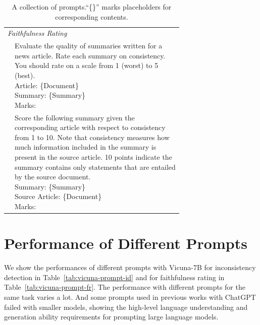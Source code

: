 \begin{table}[h!]
\begin{tabular}{l|p{4.85cm}}
		\multicolumn{2}{l}{\textit{Faithfulness Rating}} \\
		 \citet{gao2023human} & \makecell[l]{Evaluate the quality of summaries written for a \\news article. Rate each summary on consistency. \\You should rate on a scale from 1 (worst) to 5 \\(best).\\Article: \{Document\}\\Summary: \{Summary\}\\Marks:} \\
		\hline
	 \citet{luo2023chatgpt} & \makecell[l]{Score the following summary given the \\corresponding article with respect to consistency \\from 1 to 10. Note that consistency measures how\\ much information included in the summary is \\present in the source article. 10 points indicate the \\summary contains only statements that are entailed \\by the source document.\\Summary: \{Summary\}\\ Source Article: \{Document\}\\Marks:} \\
		\bottomrule[1pt]
	\end{tabular}
	\caption{A collection of prompts.``\{\}'' marks placeholders for corresponding contents.}
	\label{tab:prompt-templates}
\end{table}


\section{Performance of Different Prompts}
\label{sec:diff-prompts}

We show the performances of different prompts with Vicuna-7B for inconsistency detection in Table~\ref{tab:vicuna-prompt-id} and for faithfulness rating in Table~\ref{tab:vicuna-prompt-fr}. The performance with different prompts for the same task varies a lot. And some prompts used in previous works with ChatGPT failed with smaller models, showing the high-level language understanding and generation ability requirements for prompting large language models. 


